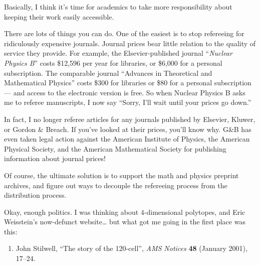 \documentclass{article}
\def\tightlist{}
\renewcommand{\texttt}[1]{%
  \begingroup
  \ttfamily
  \begingroup\lccode`~=`/\lowercase{\endgroup\def~}{/\discretionary{}{}{}}%
  \begingroup\lccode`~=`[\lowercase{\endgroup\def~}{[\discretionary{}{}{}}%
  \begingroup\lccode`~=`.\lowercase{\endgroup\def~}{.\discretionary{}{}{}}%
  \catcode`/=\active\catcode`[=\active\catcode`.=\active
  \scantokens{#1\noexpand}%
  \endgroup
}
\begin{document}
Basically, I think it's time for academics to take more responsibility
about keeping their work easily accessible.

There are lots of things you can do. One of the easiest is to stop
refereeing for ridiculously expensive journals. Journal prices bear
little relation to the quality of service they provide. For example, the
Elsevier-published journal ``\emph{Nuclear Physics B}'' costs \$12,596
per year for libraries, or \$6,000 for a personal subscription. The
comparable journal ``Advances in Theoretical and Mathematical Physics''
costs \$300 for libraries or \$80 for a personal subscription --- and
access to the electronic version is free. So when Nuclear Physics B asks
me to referee manuscripts, I now say ``Sorry, I'll wait until your
prices go down.''

In fact, I no longer referee articles for any journals published by
Elsevier, Kluwer, or Gordon \& Breach. If you've looked at their prices,
you'll know why. G\&B has even taken legal action against the American
Institute of Physics, the American Physical Society, and the American
Mathematical Society for publishing information about journal prices!


Of course, the ultimate solution is to support the math and physics
preprint archives, and figure out ways to decouple the refereeing
process from the distribution process.

Okay, enough politics. I was thinking about \(4\)-dimensional polytopes,
and Eric Weisstein's now-defunct website\ldots{} but what got me going
in the first place was this:

\begin{enumerate}
\def\labelenumi{\arabic{enumi})}
\setcounter{enumi}{4}
\tightlist
\item
  John Stilwell, ``The story of the 120-cell'', \emph{AMS Notices}
  \textbf{48} (January 2001), 17--24.
\end{enumerate}
\end{document}
